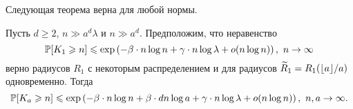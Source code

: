 
Следующая теорема верна для любой нормы. 
\begin{thm}
Пусть $d\geq 2$,  $n \gg a^d\lambda$ и $n \gg a^d$. 
Предположим, что неравенство 
\begin{equation*}
    \mathbb{P}[K_1 \geqslant n] \leqslant \exp \left(-\beta\cdot n\log n + \gamma\cdot n\log\lambda + o(n\log n)\right),\  n \to \infty
\end{equation*}{}
верно радиусов $R_1$ с некоторым распределением и для радиусов $\widetilde R_1 = R_1(\lfloor a\rfloor/a)$ одновременно.
Тогда 
\begin{equation*}
    \mathbb{P}[K_a \geqslant n] \leqslant \exp \left(-\beta\cdot n\log n + \beta\cdot dn\log a + \gamma\cdot n\log\lambda + o(n\log n)\right),\  n, a \to \infty.
\end{equation*}{}
\end{thm}

